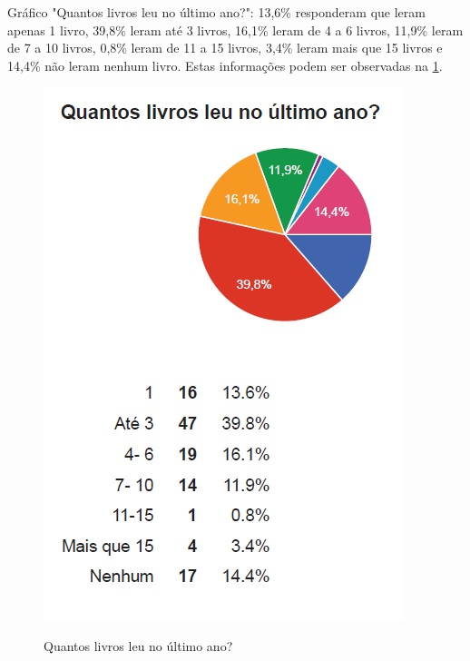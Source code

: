 \documentclass[
	article,			%
	11pt,				%
	oneside,			%
	a4paper,			%
	english,			%
	brazil,				%
	sumario=tradicional
	]{abntex2}
\begin{document}
Gráfico "Quantos livros leu no último ano?":
13,6\% responderam que leram apenas 1 livro, 39,8\% leram até 3 livros, 16,1\% leram de 4 a 6 livros, 11,9\% leram de 7 a 10 livros, 0,8\% leram de 11 a 15 livros, 3,4\% leram mais que 15 livros e 14,4\% não leram nenhum livro. Estas informações podem ser observadas na \figurename{ \ref{livroslidos}}.

\begin{figure}[h]  
	\begin{center} 
		\begin{center}
			\changecaptionwidth 
			\captionwidth{13.5cm} %
			\caption{\label{livroslidos} Quantos livros leu no último ano?}
			{\includegraphics[scale=0.8]{imagens/livroslidos}}
		\end{center}
	\end{center}
\end{figure}
\FloatBarrier


\end{document}

